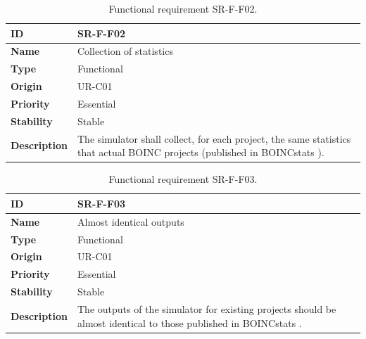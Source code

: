 \begin{center}
\begin{table}[htbp]
\centering
\begin{tabular}{@{}p{2.5cm} p{9cm}@{}} 
\toprule
\textbf{ID} 				& SR-F-F02\\
\midrule
\textbf{Name} 			& Collection of statistics \\
\midrule
\textbf{Type} 			& Functional \\
\midrule
\textbf{Origin} 			& UR-C01 \\
\midrule
\textbf{Priority}		& Essential \\
\midrule
\textbf{Stability} 		& Stable \\
\midrule
\textbf{Description} 	& The simulator shall collect, for each project, the same statistics that actual BOINC projects (published in BOINCstats \cite{BOINC2016}). \\
\bottomrule
\end{tabular}
\caption{Functional requirement SR-F-F02.}
\label{tab:srff02}
\end{table}
\end{center}

\begin{center}
\begin{table}[htbp]
\centering
\begin{tabular}{@{}p{2.5cm} p{9cm}@{}} 
\toprule
\textbf{ID} 				& SR-F-F03\\
\midrule
\textbf{Name} 			& Almost identical outputs \\
\midrule
\textbf{Type} 			& Functional \\
\midrule
\textbf{Origin} 			& UR-C01 \\
\midrule
\textbf{Priority}		& Essential \\
\midrule
\textbf{Stability} 		& Stable \\
\midrule
\textbf{Description} 	& The outputs of the simulator for existing projects should be almost identical to those published in BOINCstats \cite{BOINC2016}. \\
\bottomrule
\end{tabular}
\caption{Functional requirement SR-F-F03.}
\label{tab:srff03}
\end{table}
\end{center}

